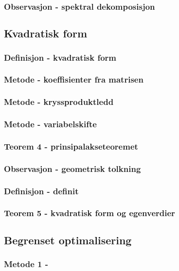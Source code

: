 \documentclass{article}
\begin{document}
      \subsubsection{Observasjon - spektral dekomposisjon}
        
    \subsection{Kvadratisk form}
      \subsubsection{Definisjon - kvadratisk form}
        
      \subsubsection{Metode - koeffisienter fra matrisen}
        
      \subsubsection{Metode - kryssproduktledd}
        
      \subsubsection{Metode - variabelskifte}
        
      \subsubsection{Teorem 4 - prinsipalakseteoremet}
        
      \subsubsection{Observasjon - geometrisk tolkning}
        
      \subsubsection{Definisjon - definit}
        
      \subsubsection{Teorem 5 - kvadratisk form og egenverdier}
        
    \subsection{Begrenset optimalisering}
      \subsubsection{Metode 1 - }
        
\end{document}
